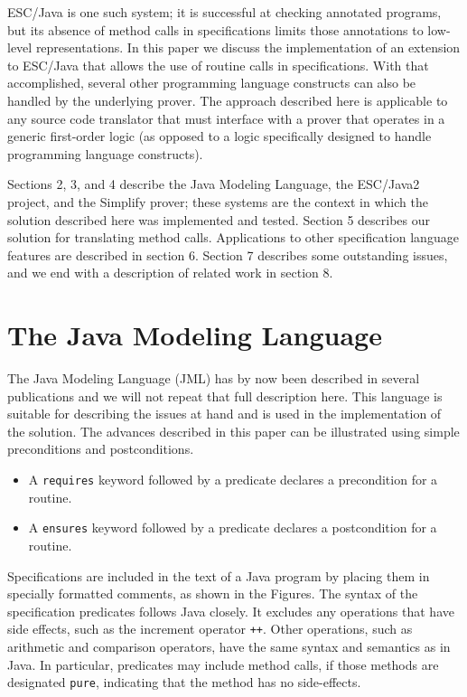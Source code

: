 \documentclass{sig-alternate}
\begin{document}
ESC/Java \cite{ESCJava,Flanagan-etal02} is one such system;
it is successful at checking 
annotated programs, but its
absence of method calls in specifications limits those annotations to
low-level representations.  In this paper we discuss the implementation
of an extension to ESC/Java that allows the use of routine calls in
specifications.  With that accomplished, several other programming
language constructs can also be handled by the underlying prover.
The approach described here is applicable to any source code translator
that must interface with a prover that operates in a generic first-order 
logic (as opposed to a logic specifically designed to handle programming language
constructs).

Sections 2, 3, and 4 describe the Java Modeling
Language, the ESC/Java2 project, and the Simplify prover; these systems
are the context in which the solution described here was implemented 
and tested.  Section 5 describes our solution for translating method calls.
Applications to other specification language features are described in section 6.
Section 7 describes some outstanding issues,
and we end with a description of related work in section 8.


\section{The Java Modeling Language}

The Java Modeling Language (JML) has by now been described in several publications
\cite{jmlpapers,Leavens-Baker-Ruby99b,Leavens-Baker-Ruby02} and we will not repeat that full description here.  This language is suitable for
describing the issues at hand and is used in the implementation of the solution.
 The advances described in this paper
can be illustrated using simple preconditions and postconditions.  
\setlength{\partopsep}{0in}\setlength{\parskip}{0in}\setlength{\itemsep}{0in}\setlength{\topsep}{0in}
\begin{itemize}
\setlength{\partopsep}{0in}\setlength{\parskip}{0in}\setlength{\itemsep}{0in}\setlength{\topsep}{0in}\item A \texttt{requires} keyword followed by a predicate declares a precondition for a routine.
\item A \texttt{ensures} keyword followed by a predicate declares a postcondition for a routine.
\end{itemize}
Specifications are included in the text of a Java program by placing them in 
specially formatted comments, as shown in the Figures.
The syntax of the specification predicates follows Java closely.  It excludes any operations 
that have side effects, such as the increment operator
 \texttt{++}.  Other operations, such as arithmetic and 
comparison operators, have the same syntax and semantics as in Java.  In particular, 
predicates may include method calls, if those methods are designated \texttt{pure},
indicating that the method has no side-effects. 
\end{document}
